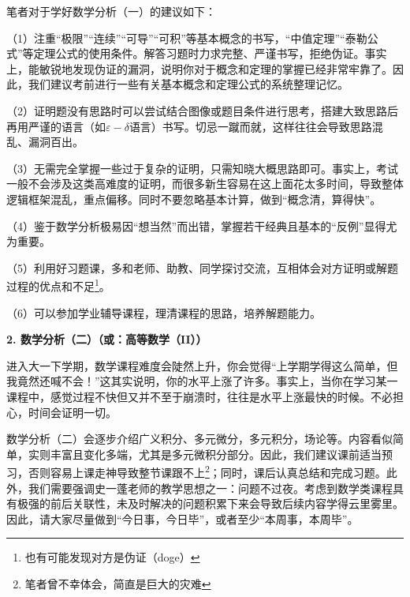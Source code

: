 \vspace{10pt}

笔者对于学好数学分析（一）的建议如下：

\vspace{10pt}

（1）注重“极限”“连续”“可导”“可积”等基本概念的书写，“中值定理”“泰勒公式”等定理公式的使用条件。解答习题时力求完整、严谨书写，拒绝伪证。事实上，能敏锐地发现伪证的漏洞，说明你对于概念和定理的掌握已经非常牢靠了。因此，我们建议考前进行一些有关基本概念和定理公式的系统整理记忆。

\vspace{10pt}

（2）证明题没有思路时可以尝试结合图像或题目条件进行思考，搭建大致思路后再用严谨的语言（如$\varepsilon-\delta$语言）书写。切忌一蹴而就，这样往往会导致思路混乱、漏洞百出。

\vspace{10pt}

（3）无需完全掌握一些过于复杂的证明，只需知晓大概思路即可。事实上，考试一般不会涉及这类高难度的证明，而很多新生容易在这上面花太多时间，导致整体逻辑框架混乱，重点偏移。同时不要忽略基本计算，做到“概念清，算得快”。

\vspace{10pt}

（4）鉴于数学分析极易因“想当然”而出错，掌握若干经典且基本的“反例”显得尤为重要。

\vspace{10pt}

（5）利用好习题课，多和老师、助教、同学探讨交流，互相体会对方证明或解题过程的优点和不足\footnote{也有可能发现对方是伪证（doge）}。

\vspace{10pt}

（6）可以参加学业辅导课程，理清课程的思路，培养解题能力。

\vspace{10pt}

\textbf{2. 数学分析（二）（或：高等数学（II））}

进入大一下学期，数学课程难度会陡然上升，你会觉得“上学期学得这么简单，但我竟然还喊不会！”这其实说明，你的水平上涨了许多。事实上，当你在学习某一课程中，感觉过程不快但又并不至于崩溃时，往往是水平上涨最快的时候。不必担心，时间会证明一切。

\vspace{10pt}

数学分析（二）会逐步介绍广义积分、多元微分，多元积分，场论等。内容看似简单，实则丰富且变化多端，尤其是多元微积分部分。因此，我们建议课前适当预习，否则容易上课走神导致整节课跟不上\footnote{笔者曾不幸体会，简直是巨大的灾难}；同时，课后认真总结和完成习题。此外，我们需要强调史一蓬老师的教学思想之一：问题不过夜。考虑到数学类课程具有极强的前后关联性，未及时解决的问题积累下来会导致后续内容学得云里雾里。因此，请大家尽量做到“今日事，今日毕”，或者至少“本周事，本周毕”。

